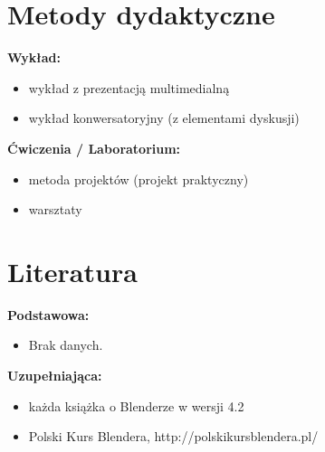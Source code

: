 \documentclass[12pt, a4paper]{article}
\begin{document}
\section{Metody dydaktyczne}

\textbf{Wykład:}
\begin{itemize}
  \item wykład z prezentacją multimedialną
  \item wykład konwersatoryjny (z elementami dyskusji)
\end{itemize}
\vspace{4pt}
\textbf{Ćwiczenia / Laboratorium:}
\begin{itemize}
  \item metoda projektów (projekt praktyczny)
  \item warsztaty
\end{itemize}
\vspace{4pt}


\section{Literatura}

\textbf{Podstawowa:}
\begin{itemize}
  \item Brak danych.
\end{itemize}

\textbf{Uzupełniająca:}
\begin{itemize}
  \item każda książka o Blenderze w wersji 4.2
  \item Polski Kurs Blendera, http://polskikursblendera.pl/
\end{itemize}
\end{document}
